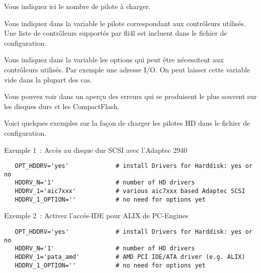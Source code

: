 \begin{description}
{
    Vous indiquez ici le nombre de pilote à charger.}

{
    Vous indiquez dans la variable  le pilote correspondant
    aux contrôleurs utilisés. Une liste de contrôleurs supportés par fli4l
    est incluent dans le fichier de configuration.
}

{
    Vous indiquez dans la variable  les options
    qui peut être nécessitent aux contrôleurs utilisés. Par exemple une
    adresse I/O. On peut laisser cette variable vide dans la plupart des cas.
}

    Vous pouvez voir dans  un aperçu des erreurs
    qui se produisent le plus souvent sur les disques durs et les CompactFlash.


    Voici quelques exemples sur la façon de charger les pilotes HD dans le
    fichier de configuration.

    Exemple 1~: Accès au disque dur SCSI avec l'Adaptec 2940

\begin{example}
\begin{verbatim}
   OPT_HDDRV='yes'             # install Drivers for Harddisk: yes or no
   HDDRV_N='1'                 # number of HD drivers
   HDDRV_1='aic7xxx'           # various aic7xxx based Adaptec SCSI 
   HDDRV_1_OPTION=''           # no need for options yet
\end{verbatim}
\end{example}

    Exemple 2~: Activez l'accés-IDE pour ALIX de PC-Engines

\begin{example}
\begin{verbatim}
   OPT_HDDRV='yes'             # install Drivers for Harddisk: yes or no
   HDDRV_N='1'                 # number of HD drivers
   HDDRV_1='pata_amd'          # AMD PCI IDE/ATA driver (e.g. ALIX)
   HDDRV_1_OPTION=''           # no need for options yet
\end{verbatim}
\end{example}

\end{description}
